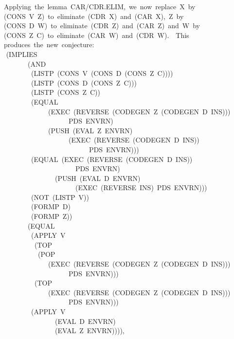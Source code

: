 \documentclass[10pt]{book}
\newenvironment{pubasis}{\begin{flushleft}}{\end{flushleft}}
\begin{document}
\begin{pubasis}
~~~~Applying~the~lemma~CAR/CDR.ELIM,~we~now~replace~X~by\\
~~~~(CONS~V~Z)~to~eliminate~(CDR~X)~and~(CAR~X),~Z~by\\
~~~~(CONS~D~W)~to~eliminate~(CDR~Z)~and~(CAR~Z)~and~W~by\\
~~~~(CONS~Z~C)~to~eliminate~(CAR~W)~and~(CDR~W).~~This\\
~~~~produces~the~new~conjecture:\\

~~	~~(IMPLIES\\
~~~~~~~~~~~(AND\\
~~~~~~~~~~~~(LISTP~(CONS~V~(CONS~D~(CONS~Z~C))))\\
~~~~~~~~~~~~(LISTP~(CONS~D~(CONS~Z~C)))\\
~~~~~~~~~~~~(LISTP~(CONS~Z~C))\\
~~~~~~~~~~~~(EQUAL\\
~~~~~~~~~~~~~~~~~(EXEC~(REVERSE~(CODEGEN~Z~(CODEGEN~D~INS)))\\
~~~~~~~~~~~~~~~~~~~~~~~PDS~ENVRN)\\
~~~~~~~~~~~~~~~~~(PUSH~(EVAL~Z~ENVRN)\\
~~~~~~~~~~~~~~~~~~~~~~~(EXEC~(REVERSE~(CODEGEN~D~INS))\\
~~~~~~~~~~~~~~~~~~~~~~~~~~~~~PDS~ENVRN)))\\
~~~~~~~~~~~~(EQUAL~(EXEC~(REVERSE~(CODEGEN~D~INS))\\
~~~~~~~~~~~~~~~~~~~~~~~~~PDS~ENVRN)\\
~~~~~~~~~~~~~~~~~~~(PUSH~(EVAL~D~ENVRN)\\
~~~~~~~~~~~~~~~~~~~~~~~~~(EXEC~(REVERSE~INS)~PDS~ENVRN)))\\
~~~~~~~~~~~~(NOT~(LISTP~V))\\
~~~~~~~~~~~~(FORMP~D)\\
~~~~~~~~~~~~(FORMP~Z))\\
~~~~~~~~~~~(EQUAL\\
~~~~~~~~~~~~(APPLY~V\\
~~~~~~~~~~~~~(TOP\\
~~~~~~~~~~~~~~(POP\\
~~~~~~~~~~~~~~~~~(EXEC~(REVERSE~(CODEGEN~Z~(CODEGEN~D~INS)))\\
~~~~~~~~~~~~~~~~~~~~~~~PDS~ENVRN)))\\
~~~~~~~~~~~~~(TOP\\
~~~~~~~~~~~~~~~~~(EXEC~(REVERSE~(CODEGEN~Z~(CODEGEN~D~INS)))\\
~~~~~~~~~~~~~~~~~~~~~~~PDS~ENVRN)))\\
~~~~~~~~~~~~(APPLY~V\\
~~~~~~~~~~~~~~~~~~~(EVAL~D~ENVRN)\\
~~~~~~~~~~~~~~~~~~~(EVAL~Z~ENVRN)))),\\


\end{pubasis}
\end{document}

